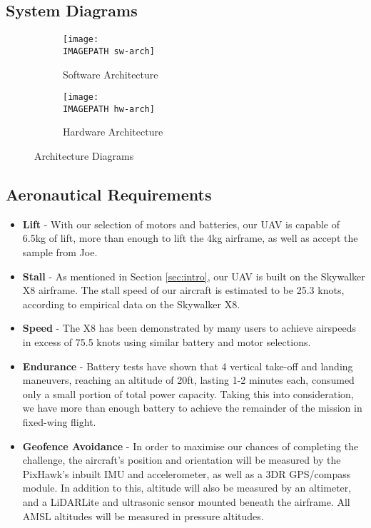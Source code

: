 \subsection{System Diagrams}
\begin{figure}[H]	
	\begin{subfigure}{0.32\textwidth}
		\centerline{\texttt{[image: \\IMAGEPATH sw-arch]}}
		\caption{Software Architecture}
		\label{fig:sw-arch}
	\end{subfigure} %
	\begin{subfigure}{.93\textwidth}
		\centerline{\texttt{[image: \\IMAGEPATH hw-arch]}}
		\caption{Hardware Architecture}
		\label{fig:hw-arch}
	\end{subfigure}
	\caption{Architecture Diagrams}
	\label{fig:arch}
\end{figure}

\subsection{Aeronautical Requirements}
\begin{itemize}
	\item \textbf{Lift} - With our selection of motors and batteries, our UAV is capable of 6.5kg of lift, more than enough to lift the 4kg airframe, as well as accept the sample from Joe.
	\item \textbf{Stall} - As mentioned in Section \ref{sec:intro}, our UAV is built on the Skywalker X8 airframe. The stall speed of our aircraft is estimated to be 25.3 knots, according to empirical data on the Skywalker X8.
	\item \textbf{Speed} - The X8 has been demonstrated by many users to achieve airspeeds in excess of 75.5 knots using similar battery and motor selections.
	\item \textbf{Endurance} - Battery tests have shown that 4 vertical take-off and landing maneuvers, reaching an altitude of 20ft, lasting 1-2 minutes each, consumed only a small portion of total power capacity. Taking this into consideration, we have more than enough battery to achieve the remainder of the mission in fixed-wing flight.
	\item \textbf{Geofence Avoidance} - In order to maximise our chances of completing the challenge, the aircraft's position and orientation will be measured by the PixHawk's inbuilt IMU and accelerometer, as well as a 3DR GPS/compass module. In addition to this, altitude will also be measured by an altimeter, and a LiDARLite and ultrasonic sensor mounted beneath the airframe. All AMSL altitudes will be measured in pressure altitudes.
\end{itemize}

